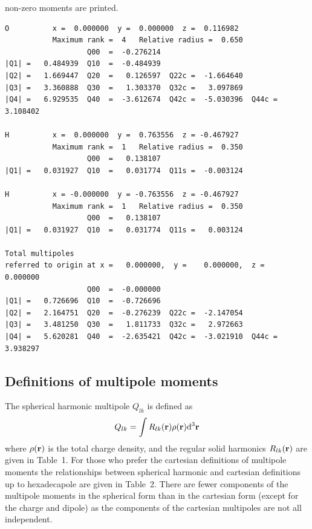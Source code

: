 \documentclass[12pt,txfonts]{paper}
\renewcommand{\baselinestretch}{1.05}
\begin{document}
non-zero moments are printed.
\small
\renewcommand{\baselinestretch}{1.0}\small
\begin{verbatim}
O          x =  0.000000  y =  0.000000  z =  0.116982
           Maximum rank =  4   Relative radius =  0.650
                   Q00  =  -0.276214
|Q1| =   0.484939  Q10  =  -0.484939
|Q2| =   1.669447  Q20  =   0.126597  Q22c =  -1.664640
|Q3| =   3.360888  Q30  =   1.303370  Q32c =   3.097869
|Q4| =   6.929535  Q40  =  -3.612674  Q42c =  -5.030396  Q44c =   3.108402

H          x =  0.000000  y =  0.763556  z = -0.467927
           Maximum rank =  1   Relative radius =  0.350
                   Q00  =   0.138107
|Q1| =   0.031927  Q10  =   0.031774  Q11s =  -0.003124

H          x = -0.000000  y = -0.763556  z = -0.467927
           Maximum rank =  1   Relative radius =  0.350
                   Q00  =   0.138107
|Q1| =   0.031927  Q10  =   0.031774  Q11s =   0.003124

Total multipoles
referred to origin at x =   0.000000,  y =    0.000000,  z =    0.000000
                   Q00  =  -0.000000
|Q1| =   0.726696  Q10  =  -0.726696
|Q2| =   2.164751  Q20  =  -0.276239  Q22c =  -2.147054
|Q3| =   3.481250  Q30  =   1.811733  Q32c =   2.972663
|Q4| =   5.620281  Q40  =  -2.635421  Q42c =  -3.021910  Q44c =   3.938297
\end{verbatim}

\normalsize
\subsection{Definitions of multipole moments}
\label{multipoles}

The spherical
harmonic multipole $Q_{lk}$ is defined as
\begin{equation*}
Q_{lk} = \int R_{lk}({\bf r}) \rho({\bf r}) {\rm d}^3{\bf r}
\end{equation*}
where $\rho({\bf r})$ is the total charge density, and the regular
solid harmonics $R_{lk}({\bf r})$ are given in Table~1. For those who
prefer the cartesian definitions of multipole moments the relationships
between spherical harmonic and cartesian definitions up to
hexadecapole are given in Table~2.
There are fewer components of the multipole moments in the spherical form
than in the cartesian form (except for the charge and dipole) as the
components of the cartesian multipoles are not all independent.
\end{document}
